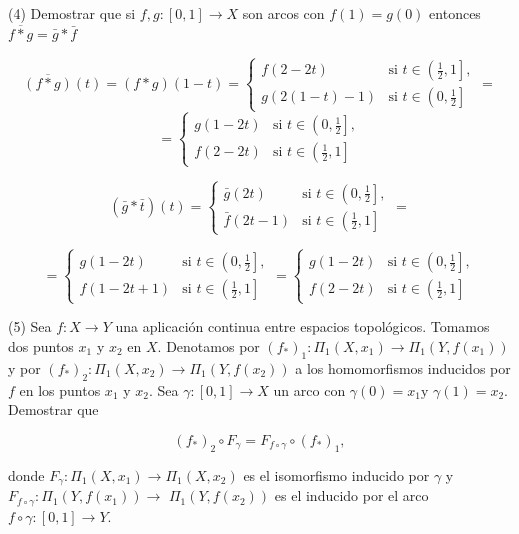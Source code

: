 \documentclass[
  a4paper,
  spanish,
  12pt,
]{scrartcl}
\begin{document}
\begin{ejer}
(4) Demostrar que si $f, g:[0,1] \rightarrow X$ son arcos con $f(1)=g(0)$ entonces $\overline{f * g}=\bar{g} * \bar{f}$\\
\end{ejer}

$$
\overline{(f*g)}(t) = (f*g)(1-t) =
\begin{cases} 
    f(2 - 2t) & \text{si } t \in \left( \frac{1}{2}, 1 \right], \\
    g(2(1 - t) - 1) & \text{si } t \in \left( 0, \frac{1}{2} \right]
\end{cases} =
$$
$$
= \begin{cases} 
    g(1 - 2t) & \text{si } t \in \left( 0, \frac{1}{2} \right],  \\
    f(2 - 2t) & \text{si } t \in \left( \frac{1}{2}, 1 \right]
\end{cases}
$$

$$
(\bar{g}*\bar{t})(t) = 
\begin{cases} 
    \bar{g}(2t) & \text{si } t \in \left( 0, \frac{1}{2} \right], \\
    \bar{f}(2t-1) & \text{si } t \in \left( \frac{1}{2}, 1 \right]
\end{cases} =
$$

$$
= \begin{cases} 
    g(1-2t) & \text{si } t \in \left( 0, \frac{1}{2} \right], \\
    f(1-2t+1) & \text{si } t \in \left( \frac{1}{2}, 1 \right]
\end{cases} =
\begin{cases} 
    g(1-2t) & \text{si } t \in \left( 0, \frac{1}{2} \right], \\
    f(2-2t) & \text{si } t \in \left( \frac{1}{2}, 1 \right]
\end{cases}
$$

\begin{ejer}
(5) Sea $f: X \rightarrow Y$ una aplicación continua entre espacios topológicos. Tomamos dos puntos $x_{1}$ y $x_{2}$ en $X$. Denotamos por $\left(f_{*}\right)_{1}: \Pi_{1}\left(X, x_{1}\right) \rightarrow \Pi_{1}\left(Y, f\left(x_{1}\right)\right)$ y por $\left(f_{*}\right)_{2}: \Pi_{1}\left(X, x_{2}\right) \rightarrow \Pi_{1}\left(Y, f\left(x_{2}\right)\right)$ a los homomorfismos inducidos por $f$ en los puntos $x_{1}$ y $x_{2}$. Sea $\gamma:[0,1] \rightarrow X$ un arco con $\gamma(0)=x_{1} \mathrm{y}$ $\gamma(1)=x_{2}$. Demostrar que

$$
\left(f_{*}\right)_{2} \circ F_{\gamma}=F_{f \circ \gamma} \circ\left(f_{*}\right)_{1},
$$

donde $F_{\gamma}: \Pi_{1}\left(X, x_{1}\right) \rightarrow \Pi_{1}\left(X, x_{2}\right)$ es el isomorfismo inducido por $\gamma$ y $F_{f \circ \gamma}: \Pi_{1}\left(Y, f\left(x_{1}\right)\right) \rightarrow$ $\Pi_{1}\left(Y, f\left(x_{2}\right)\right)$ es el inducido por el arco $f \circ \gamma:[0,1] \rightarrow Y$.\\
\end{ejer}
\end{document}
